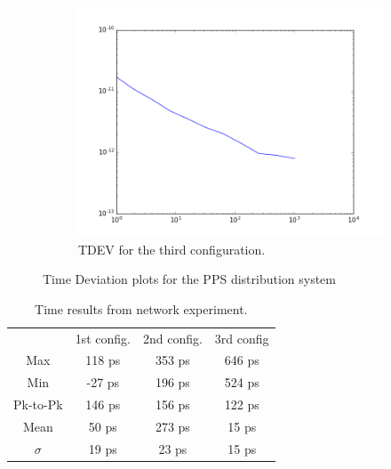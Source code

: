 \begin{figure}[H]
    \centering
    \begin{subfigure}[t]{.45\textwidth}
        \centering
        \includegraphics[width=\textwidth]{img/pps_p3.png}
        \caption{TDEV for the third configuration.}
        \label{fig:pps_p3}
    \end{subfigure}
    \caption{Time Deviation plots for the PPS distribution system}
    \label{fig:tdev_plots}
\end{figure}

\begin{table}\centering
    \begin{tabular}{cccc}
        & 1st config. & 2nd config. & 3rd config \\ 
        Max & 118 ps & 353 ps & 646 ps \\ 
        Min & -27 ps & 196 ps & 524 ps \\ 
        Pk-to-Pk & 146 ps & 156 ps & 122 ps \\ 
        Mean & 50 ps & 273 ps & 15 ps \\ 
        $\sigma$ & 19 ps & 23 ps & 15 ps \\ 
    \end{tabular}
    \caption{Time results from network experiment.}
    \label{tab:netres}
\end{table}


